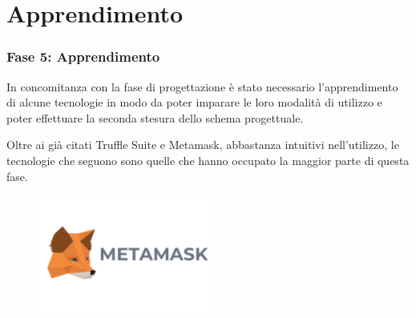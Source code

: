 \documentclass{beamer}
\begin{document}
\section{Apprendimento}
\begin{frame}
	\frametitle{Fase 5: Apprendimento}
	In concomitanza con la fase di progettazione è stato necessario l’apprendimento di alcune tecnologie in modo da poter imparare le loro modalità di utilizzo e poter effettuare la seconda stesura dello schema progettuale.

	Oltre ai già citati Truffle Suite e Metamask, abbastanza intuitivi nell'utilizzo, le tecnologie che seguono sono quelle che hanno occupato la maggior parte di questa fase.
	\begin{figure}
		\includegraphics[width=0.50\textwidth]{figures/metamask.png}
	\end{figure}
\end{frame}
\end{document}
